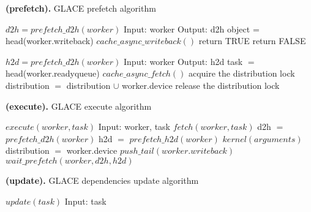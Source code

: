 \documentclass[preprint,11pt]{elsarticle}
\begin{document}
\begin{algorithm}
\caption{{\bf (prefetch).} GLACE prefetch algorithm}
\label{alg:prefetch}
{\footnotesize
\begin{minipage} [t] {0.4\textwidth}
\begin{algorithmic} [1]
\STATE $d2h = prefetch\_d2h(worker)$
\STATE Input: worker
\STATE Output: d2h
  \STATE object = head(worker.writeback)
    \STATE $cache\_async\_writeback()$
    \STATE return TRUE
  \ENDIF
\ENDIF
\STATE return FALSE
\end{algorithmic}
\end{minipage}
\begin{minipage} [t] {0.6\textwidth}
\begin{algorithmic} [1]
\STATE $h2d = prefetch\_d2h(worker)$
\STATE Input: worker
\STATE Output: h2d 
  \STATE task $=$ head(worker.readyqueue)
        \STATE $cache\_async\_fetch()$
        \STATE acquire the distribution lock
        \STATE distribution $=$ distribution $\cup$ worker.device
        \STATE release the distribution lock
      \ENDIF
    \ENDIF
  \ENDFOR
\ENDIF
\end{algorithmic}
\end{minipage}
}
\end{algorithm}

\begin{algorithm}
\caption{{\bf (execute).} GLACE execute algorithm}
\label{alg:execute}
{\footnotesize
\begin{algorithmic} [1]
\STATE $execute(worker, task)$
\STATE Input: worker, task
\STATE $fetch(worker, task)$ \label{ln:simple1}
\STATE d2h $=$ $prefetch\_d2h(worker)$
\STATE h2d $=$ $prefetch\_h2d(worker)$
\STATE $kernel(arguments)$ \label{ln:simple2}
  \STATE distribution $=$ worker.device
  \STATE $push\_tail(worker.writeback)$  
\ENDFOR
\STATE $wait\_prefetch(worker, d2h, h2d)$
\end{algorithmic}
}
\end{algorithm}

\begin{algorithm}
\caption{{\bf (update).} GLACE dependencies update algorithm}
\label{alg:update}
{\footnotesize
\begin{algorithmic} [1]
\STATE $update(task)$
\STATE Input: task
\STATE
\end{algorithmic}
}
\end{algorithm}
\end{document}

